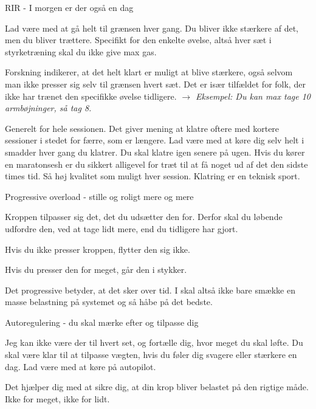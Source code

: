 \begin{multicols}{2}
  \begin{tList}{RIR - I morgen er der også en dag}

  \item Lad være med at gå helt til grænsen hver gang. Du bliver ikke
    stærkere af det, men du bliver trættere.
    Specifikt for den enkelte øvelse, altså hver sæt i
    styrketræning skal du ikke give max gas.

    Forskning indikerer, at det helt klart er
    muligt at blive stærkere, også selvom man ikke presser sig selv
    til grænsen hvert sæt. Det er især tilfældet for folk, der ikke
    har trænet den specifikke øvelse tidligere.
    \emph{$\rightarrow$ Eksempel: Du kan max tage 10 armbøjninger, så tag 8.}

  \item Generelt for hele sessionen. Det giver mening at klatre
    oftere med kortere sessioner i stedet for færre, som er længere.
    Lad være med at køre dig selv helt i smadder hver gang du
    klatrer. Du skal klatre igen senere på ugen.
    Hvis du kører en maratonsesh er du sikkert alligevel for træt
    til at få noget ud af det den sidste times tid.
    Så høj kvalitet som muligt hver session. Klatring er en teknisk sport.

  \end{tList}

  \begin{tList}{Progressive overload - stille og roligt mere og mere}
  \item Kroppen tilpasser sig det, det du udsætter den for. Derfor
    skal du løbende udfordre den, ved at tage lidt mere, end du
    tidligere har gjort.
  \item Hvis du ikke presser kroppen, flytter den sig ikke.
  \item Hvis du presser den for meget, går den i stykker.
  \item Det progressive betyder, at det sker over tid. I skal altså
    ikke bare smække en masse belastning på systemet og så håbe på det bedste.
  \end{tList}\newpage

  \begin{tList}{Autoregulering - du skal mærke efter og tilpasse dig}
  \item Jeg kan ikke være der til hvert set, og fortælle dig, hvor
    meget du skal løfte. Du skal være klar til at tilpasse vægten,
    hvis du føler dig svagere eller stærkere en dag. Lad være med at
    køre på autopilot.
  \item Det hjælper dig med at sikre dig, \hspace{.5em}
    at din krop bliver belastet
    på den rigtige måde. Ikke for meget, ikke for lidt.
  \end{tList} \columnbreak 



\end{multicols}
